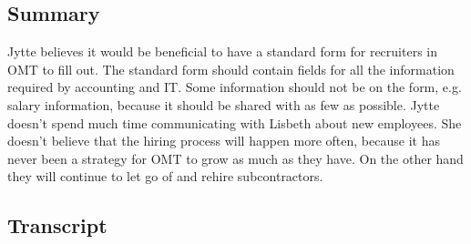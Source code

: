 \subsection{Summary}
Jytte believes it would be beneficial to have a standard form for recruiters in OMT to fill out.
The standard form should contain fields for all the information required by accounting and IT.
Some information should not be on the form, e.g. salary information, because it should be shared with as few as possible.
Jytte doesn't spend much time communicating with Lisbeth about new employees.
She doesn't believe that the hiring process will happen more often, because it has never been a strategy for OMT to grow as much as they have.
On the other hand they will continue to let go of and rehire subcontractors.
\subsection{Transcript}
